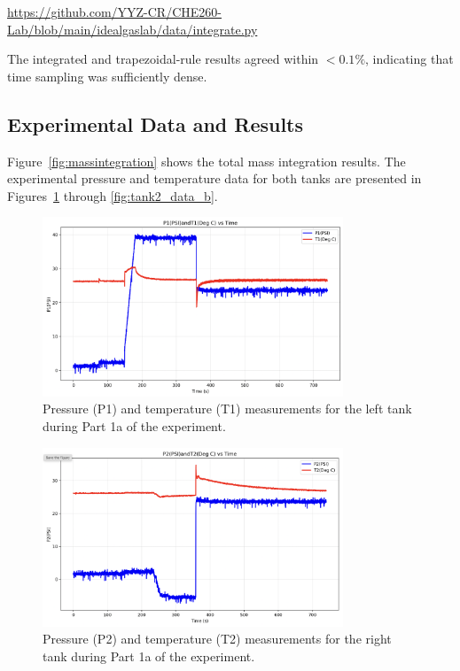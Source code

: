 \documentclass[12pt]{article}
\begin{document}
\url{https://github.com/YYZ-CR/CHE260-Lab/blob/main/idealgaslab/data/integrate.py}

The integrated and trapezoidal-rule results agreed within \(<0.1\%\), indicating that time sampling was sufficiently dense.  

\subsection*{Experimental Data and Results}

Figure~\ref{fig:massintegration} shows the total mass integration results. The experimental pressure and temperature data for both tanks are presented in Figures~\ref{fig:tank1_data_a} through \ref{fig:tank2_data_b}.

\begin{figure}[h!]
\centering
\includegraphics[width=0.8\textwidth]{1a-left_tank.png}
\caption{Pressure (P1) and temperature (T1) measurements for the left tank during Part 1a of the experiment.}
\label{fig:tank1_data_a}
\end{figure}

\begin{figure}[h!]
\centering
\includegraphics[width=0.8\textwidth]{1a-right_tank.png}
\caption{Pressure (P2) and temperature (T2) measurements for the right tank during Part 1a of the experiment.}
\label{fig:tank2_data_a}
\end{figure}
\end{document}
